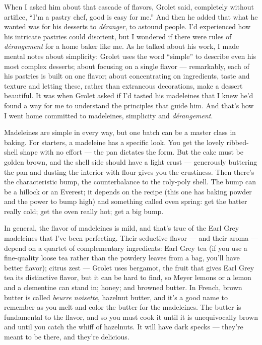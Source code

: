 When I asked him about that cascade of flavors, Grolet said, completely
without artifice, ``I'm a pastry chef, good is easy for me.'' And then
he added that what he wanted was for his desserts to \emph{déranger}, to
astound people. I'd experienced how his intricate pastries could
disorient, but I wondered if there were rules of \emph{dérangement} for
a home baker like me. As he talked about his work, I made mental notes
about simplicity: Grolet uses the word ``simple'' to describe even his
most complex desserts; about focusing on a single flavor --- remarkably,
each of his pastries is built on one flavor; about concentrating on
ingredients, taste and texture and letting these, rather than extraneous
decorations, make a dessert beautiful. It was when Grolet asked if I'd
tasted his madeleines that I knew he'd found a way for me to understand
the principles that guide him. And that's how I went home committed to
madeleines, simplicity and \emph{dérangement}.

Madeleines are simple in every way, but one batch can be a master class
in baking. For starters, a madeleine has a specific look. You get the
lovely ribbed-shell shape with no effort --- the pan dictates the form.
But the cake must be golden brown, and the shell side should have a
light crust --- generously buttering the pan and dusting the interior
with flour gives you the crustiness. Then there's the characteristic
bump, the counterbalance to the roly-poly shell. The bump can be a
hillock or an Everest; it depends on the recipe (this one has baking
powder and the power to bump high) and something called oven spring: get
the batter really cold; get the oven really hot; get a big bump.

In general, the flavor of madeleines is mild, and that's true of the
Earl Grey madeleines that I've been perfecting. Their seductive flavor
--- and their aroma --- depend on a quartet of complementary
ingredients: Earl Grey tea (if you use a fine-quality loose tea rather
than the powdery leaves from a bag, you'll have better flavor); citrus
zest --- Grolet uses bergamot, the fruit that gives Earl Grey tea its
distinctive flavor, but it can be hard to find, so Meyer lemons or a
lemon and a clementine can stand in; honey; and browned butter. In
French, brown butter is called \emph{beurre noisette}, hazelnut butter,
and it's a good name to remember as you melt and color the butter for
the madeleines. The butter is fundamental to the flavor, and so you must
cook it until it is unequivocally brown and until you catch the whiff of
hazelnuts. It will have dark specks --- they're meant to be there, and
they're delicious.

